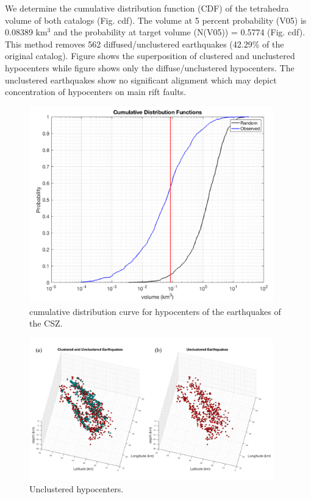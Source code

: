 \documentclass[draft]{agujournal2018}
\begin{document}
We determine the cumulative distribution function (CDF) of the tetrahedra volume of both catalogs (Fig. cdf). The volume at 5 percent probability (V05) is 0.08389 km$^{3}$ and the probability at target volume (N(V05)) = 0.5774 (Fig. cdf). This method removes 562 diffused/unclustered earthquakes (42.29\% of the original catalog). Figure \unclusteredA shows the superposition of clustered and unclustered hypocenters while figure \unclusteredA shows only the diffuse/unclustered hypocenters. The unclustered earthquakes show no significant alignment which may depict concentration of hypocenters on main rift faults. 

\begin{figure}[ht]
\centering
\includegraphics[width=25pc]{Figures/cdf_cum_only.png}
\caption{cumulative distribution curve for hypocenters of the earthquakes of the CSZ.}
\label{figfive}
\end{figure}

\begin{figure}[ht]
\centering
\includegraphics[width=25pc]{Figures/unclustered_cum_only_results.png}
\caption{Unclustered hypocenters.}
\label{figthree}
\end{figure}
\end{document}
